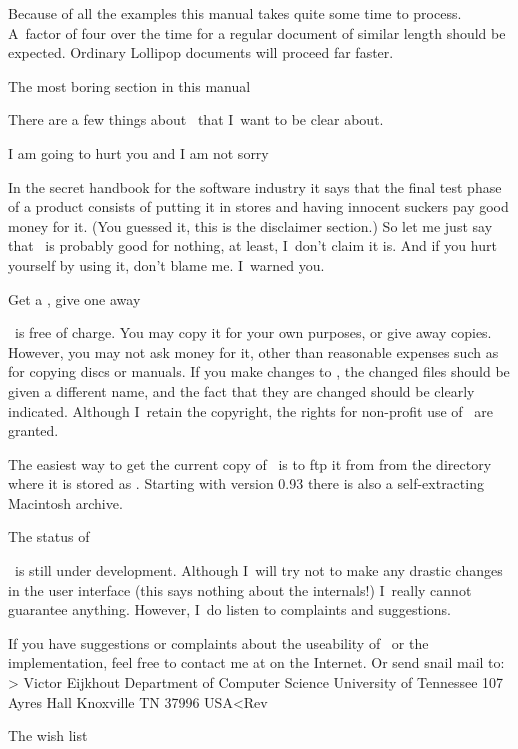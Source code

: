 Because of all the examples this manual takes quite some time to
process. A~factor of four over the time for a regular document of
similar length should be expected. Ordinary Lollipop documents will
proceed far faster.

\Section The most boring section in this manual

There are a few things about \Lollipop\ that I~want to be clear about.

\SubSection I am going to hurt you and I am not sorry

In the secret handbook for the software industry it says that the
final test phase of a product consists of putting it in stores and
having innocent suckers pay good money for it. (You guessed it, this
is the disclaimer section.) So let me just say that 
\Lollipop\ is probably good for nothing, at least, I~don't claim it
is. And if you hurt yourself by using it, don't blame me. I~warned
you.

\SubSection Get a \Lollipop, give one away

\Lollipop\ is free of charge. You may copy it
for your own purposes, or give away copies. However, you may not ask
money for it, other than reasonable expenses such as for copying discs
or manuals. If you make changes to \Lollipop, the changed files
should be given a different name, and the fact that they are changed
should be clearly indicated. Although I~retain the copyright, the
rights for non-profit use of \Lollipop\ are granted.

The easiest way to get the current copy of \Lollipop\ is to ftp it
from  from the directory  where it
is stored as . Starting with version 0.93 there
is also a self-extracting Macintosh archive.

\SubSection The status of \Lollipop

\Lollipop\ is still under development. Although I~will try not to
make any drastic changes in the user interface (this says nothing
about the internals!) I~really cannot guarantee anything.
However, I~do listen to complaints and suggestions. 

If you have suggestions or complaints about the
useability of \Lollipop\ or the implementation, feel free to contact
me at  on the Internet. Or send snail mail
to:
\Ver>    Victor Eijkhout
    Department of Computer Science
    University of Tennessee
    107 Ayres Hall
    Knoxville TN 37996
    USA<Rev

 The wish list

